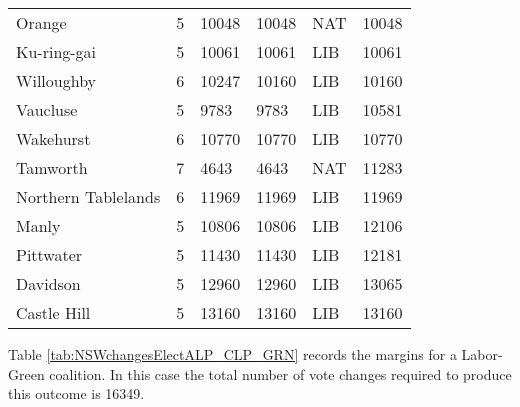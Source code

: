 \documentclass{article}
\begin{document}
\begin{center}
\begin{longtable}{lllllr}
Orange & 5 & 10048 & 10048 & NAT & 10048\\
Ku-ring-gai & 5 & 10061 & 10061 & LIB & 10061\\
Willoughby & 6 & 10247 & 10160 & LIB & 10160\\
Vaucluse & 5 & 9783 & 9783 & LIB & 10581\\
Wakehurst & 6 & 10770 & 10770 & LIB & 10770\\
Tamworth & 7 & 4643 & 4643 & NAT & 11283\\
Northern Tablelands & 6 & 11969 & 11969 & LIB & 11969\\
Manly & 5 & 10806 & 10806 & LIB & 12106\\
Pittwater & 5 & 11430 & 11430 & LIB & 12181\\
Davidson & 5 & 12960 & 12960 & LIB & 13065\\
Castle Hill & 5 & 13160 & 13160 & LIB & 13160\\
\hline
\end{longtable}
\end{center}

Table \ref{tab:NSWchangesElectALP_CLP_GRN} records the margins for a Labor-Green coalition.  In this case the total number of vote changes required to produce this outcome is 16349.
\end{document}
